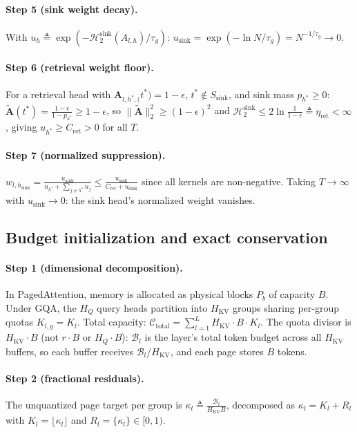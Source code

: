 \documentclass[final,5p,times,twocolumn]{elsarticle}
\theoremstyle{definition}
\theoremstyle{remark}
\newcommand{\HQ}{H_{Q}}
\newcommand{\HKV}{H_{\mathrm{KV}}}
\newcommand{\Attn}[2]{\mathbf{A}_{#1,#2}}
\newcommand{\Ssink}{S_{\mathrm{sink}}}
\newcommand{\Hsink}{\mathcal{H}^{\mathrm{sink}}_{2}}
\begin{document}
\paragraph{Step 5 (sink weight decay).}
With $u_h \triangleq \exp(-\Hsink(A_{l,h})/\tau_g)$:
 $u_{\mathrm{sink}} = \exp(-\ln N/\tau_g) = N^{-1/\tau_g} \to 0$.

\paragraph{Step 6 (retrieval weight floor).}
For a retrieval head with
 $\Attn{l,h^{*}}(t^{*}) = 1-\epsilon$, $t^{*}\notin\Ssink$, and sink
mass $p_{h^{*}} \ge 0$:
 $\tilde{\mathbf{A}}(t^{*}) = \frac{1-\epsilon}{1-p_{h^{*}}} \ge
1-\epsilon$, so $\|\tilde{\mathbf{A}}\|_2^2 \ge (1-\epsilon)^2$ and
 $\Hsink \le 2\ln\frac{1}{1-\epsilon} \triangleq \eta_{\mathrm{ret}} <
\infty$, giving $u_{h^{*}} \ge C_{\mathrm{ret}} > 0$ for all $T$.

\paragraph{Step 7 (normalized suppression).}
 $w_{l,h_{\mathrm{sink}}} = \frac{u_{\mathrm{sink}}}{u_{h^{*}} +
\sum_{j\neq h^{*}} u_j} \le \frac{u_{\mathrm{sink}}}{C_{\mathrm{ret}} +
u_{\mathrm{sink}}}$ since all kernels are non-negative. Taking
 $T \to \infty$ with $u_{\mathrm{sink}} \to 0$: the sink head's
normalized weight vanishes.

\subsection{Budget initialization and exact conservation}
\label{app:budget}

\paragraph{Step 1 (dimensional decomposition).}
In PagedAttention, memory is allocated as physical blocks $P_b$ of
capacity $B$. Under GQA, the $\HQ$ query heads partition into $\HKV$ groups sharing per-group quotas $K_{l,g} = K_l$. Total capacity:
 $\mathcal{C}_{\mathrm{total}} = \sum_{l=1}^{L}\HKV\cdot B\cdot K_l$.
The quota divisor is $\HKV\cdot B$ (not $r\cdot B$ or $\HQ\cdot B$):
 $\mathcal{B}_l$ is the layer's total token budget across all $\HKV$ buffers, so each buffer receives $\mathcal{B}_l/\HKV$, and each page
stores $B$ tokens.

\paragraph{Step 2 (fractional residuals).}
The unquantized page target per group is
 $\kappa_l \triangleq \frac{\mathcal{B}_l}{\HKV B}$, decomposed as
 $\kappa_l = K_l + R_l$ with $K_l = \lfloor\kappa_l\rfloor$ and
 $R_l = \{\kappa_l\} \in [0,1)$.
\end{document}
